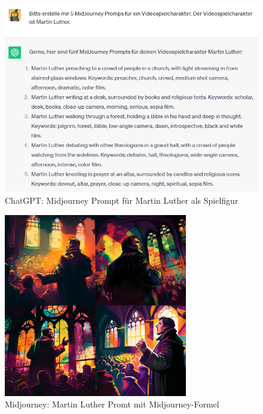 \begin{figure}
	\centering
	\includegraphics[scale=0.7]{BilderFuerBA/07.png}
	\caption{ChatGPT: Midjourney Prompt für Martin Luther als Spielfigur}
	\label{chatgptMartinLutherMJformelErstenFünf}
\end{figure}


\begin{figure}
	\centering
	\includegraphics[width=8.022cm]{BilderFuerBA/MidJourneyMLMitFormel.png}
	\caption{Midjourney: Martin Luther Promt mit Midjourney-Formel}
	\label{MidJourneyMLMitFormel}
\end{figure}

